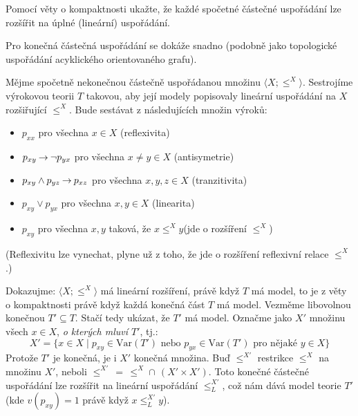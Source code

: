 \begin{problem}
    Pomocí věty o kompaktnosti ukažte, že každé spočetné částečné uspořádání lze rozšířit na úplné (lineární) uspořádání.

    \begin{solution}

        Pro konečná částečná uspořádání se dokáže snadno (podobně jako topologické uspořádání acyklického orientovaného grafu). 
        
        Mějme spočetně nekonečnou částečně uspořádanou množinu $\langle X;\leq^X\rangle$. Sestrojíme výrokovou teorii $T$ takovou, aby její modely popisovaly lineární uspořádání na $X$ rozšiřující $\leq^X$. Bude sestávat z následujících množin výroků:
        \begin{itemize}
            \item $p_{xx}$ pro všechna $x\in X$ \hfill (reflexivita)
            \item $p_{xy}\mathbin{\rightarrow}\neg p_{yx}$ pro všechna $x\neq y\in X$ \hfill (antisymetrie)
            \item $p_{xy}\land p_{yz}\mathbin{\rightarrow} p_{xz}$ pro všechna $x,y,z\in X$ \hfill (tranzitivita)
            \item $p_{xy}\lor p_{yx}$ pro všechna $x,y\in X$ \hfill (linearita)
            \item $p_{xy}$ pro všechna $x,y$ taková, že $x\leq^X y$\hfill (jde o rozšíření $\leq^X$)
        \end{itemize}
        (Reflexivitu lze vynechat, plyne už z toho, že jde o rozšíření reflexivní relace $\leq^X$.)

        Dokazujme: $\langle X;\leq^X\rangle$ má lineární rozšíření, právě když $T$ má model, to je z věty o kompaktnosti právě když každá konečná část $T$ má model. Vezměme libovolnou konečnou $T'\subseteq T$. Stačí tedy ukázat, že $T'$ má model. Označme jako $X'$ množinu všech $x\in X$, \emph{o kterých mluví $T'$}, tj.:
        $$
        X'=\{x\in X\mid p_{xy}\in\mathrm{Var}(T')\text{ nebo }p_{yx}\in\mathrm{Var}(T')\text{ pro nějaké }y\in X\}
        $$
        Protože $T'$ je konečná, je i $X'$ konečná množina. Buď $\leq^{X'}$ restrikce $\leq^X$ na množinu $X'$, neboli $\leq^{X'}\,=\,\leq^X \mathbin{\cap}\, (X'\times X')$. Toto konečné částečné uspořádání lze rozšířit na lineární uspořádání $\leq^{X'}_L$, což nám dává model teorie $T'$ (kde $v(p_{xy})=1$ právě když $x\leq^{X'}_L y$).
        
    \end{solution}
    
\end{problem}
        
